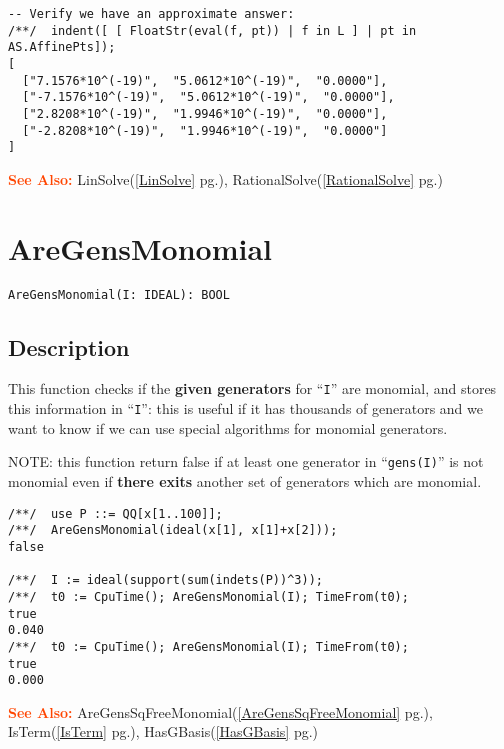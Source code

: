 \documentclass[a4paper]{mybook}
\newenvironment{command}{}{} %
\newcommand\SeeAlso{\par\textcolor{OrangeRed}{\textbf{\large See Also: }}}
\begin{document}
\begin{command}
\begin{Verbatim}[label=example, rulecolor=\color{PineGreen}, frame=single]
-- Verify we have an approximate answer:
/**/  indent([ [ FloatStr(eval(f, pt)) | f in L ] | pt in AS.AffinePts]);
[
  ["7.1576*10^(-19)",  "5.0612*10^(-19)",  "0.0000"],
  ["-7.1576*10^(-19)",  "5.0612*10^(-19)",  "0.0000"],
  ["2.8208*10^(-19)",  "1.9946*10^(-19)",  "0.0000"],
  ["-2.8208*10^(-19)",  "1.9946*10^(-19)",  "0.0000"]
]
\end{Verbatim}


\SeeAlso %
  LinSolve(\ref{LinSolve} pg.\pageref{LinSolve}), 
    RationalSolve(\ref{RationalSolve} pg.\pageref{RationalSolve})
\end{command} %

\section{AreGensMonomial}
\label{AreGensMonomial}
\begin{command} %


\begin{Verbatim}[label=syntax, rulecolor=\color{MidnightBlue},
frame=single]
AreGensMonomial(I: IDEAL): BOOL
\end{Verbatim}


\subsection*{Description}

This function checks if the \textbf{given generators} for ``\verb&I&'' are
monomial, and stores this information in ``\verb&I&'': this is useful if
it has thousands of generators and we want to know if we can use
special algorithms for monomial generators.
\par 
NOTE: this function return false if at least one generator in ``\verb&gens(I)&'' 
is not monomial even if \textbf{there exits} another set of generators
which are monomial.
\begin{Verbatim}[label=example, rulecolor=\color{PineGreen}, frame=single]
/**/  use P ::= QQ[x[1..100]];
/**/  AreGensMonomial(ideal(x[1], x[1]+x[2]));
false

/**/  I := ideal(support(sum(indets(P))^3));
/**/  t0 := CpuTime(); AreGensMonomial(I); TimeFrom(t0);
true
0.040
/**/  t0 := CpuTime(); AreGensMonomial(I); TimeFrom(t0);
true
0.000
\end{Verbatim}


\SeeAlso %
  AreGensSqFreeMonomial(\ref{AreGensSqFreeMonomial} pg.\pageref{AreGensSqFreeMonomial}), 
    IsTerm(\ref{IsTerm} pg.\pageref{IsTerm}), 
    HasGBasis(\ref{HasGBasis} pg.\pageref{HasGBasis})
\end{command} %
\end{document}
